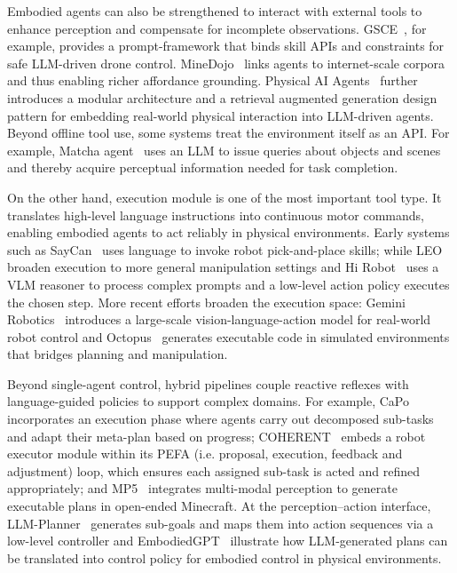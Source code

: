 Embodied agents can also be strengthened to interact with external tools to enhance perception and compensate for incomplete observations. GSCE~\cite{wang2025gscepromptframeworkenhanced}, for example, provides a prompt-framework that binds skill APIs and constraints for safe LLM-driven drone control. MineDojo~\cite{fan2022minedojo} links agents to internet-scale corpora and thus enabling richer affordance grounding. Physical AI Agents~\cite{bousetouane2025physicalaiagentsintegrating} further introduces a modular architecture and a retrieval augmented generation design pattern for embedding real-world physical interaction into LLM-driven agents. Beyond offline tool use, some systems treat the environment itself as an API. For example, Matcha agent~\cite{zhao2023chatenvironmentinteractivemultimodal} uses an LLM to issue queries about objects and scenes and thereby acquire perceptual information needed for task completion.



On the other hand, execution module is one of the most important tool type. It translates high-level language instructions into continuous motor commands, enabling embodied agents to act reliably in physical environments.  Early systems such as SayCan~\cite{ahn2022icanisay} uses language to invoke robot pick-and-place skills; while LEO~\cite{huang2024embodiedgeneralistagent3d} broaden execution to more general manipulation settings and Hi Robot~\cite{shi2025hi} uses a VLM reasoner to process complex prompts and a low-level action policy executes the chosen step. More recent efforts broaden the execution space: Gemini Robotics~\cite{geminiroboticsteam2025geminiroboticsbringingai} introduces a large-scale vision-language-action model for real-world robot control and Octopus~\cite{yang2024octopusembodiedvisionlanguageprogrammer} generates executable code in simulated environments that bridges planning and manipulation. 


Beyond single-agent control, hybrid pipelines couple reactive reflexes with language-guided policies to support complex domains. For example, CaPo~\cite{liu2024capo} incorporates an execution phase where agents carry out decomposed sub-tasks and adapt their meta-plan based on progress; COHERENT~\cite{liu2024coherent} embeds a robot executor module within its PEFA (i.e. proposal, execution, feedback and adjustment) loop, which ensures each assigned sub-task is acted and refined appropriately; and MP5~\cite{qin2024mp5multimodalopenendedembodied} integrates multi-modal perception to generate executable plans in open-ended Minecraft. At the perception–action interface, LLM-Planner~\cite{song2023llmplannerfewshotgroundedplanning} generates sub-goals and maps them into action sequences via a low-level controller and EmbodiedGPT~\cite{mu2023embodiedgptvisionlanguagepretrainingembodied} illustrate how LLM-generated plans can be translated into control policy for embodied control in physical environments. 



